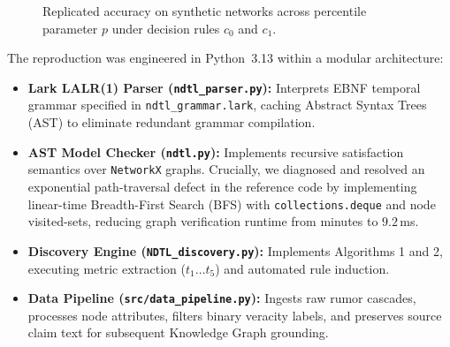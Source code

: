 \documentclass[10pt,twocolumn]{article}
\begin{document}
\begin{figure}[t]
\centering
{}
\caption{Replicated accuracy on synthetic networks across percentile parameter $p$ under decision rules $c_0$ and $c_1$.}
\label{fig:synthetic_accuracy}
\end{figure}

The reproduction was engineered in Python~3.13 within a modular architecture:
\begin{itemize}
    \item \textbf{Lark LALR(1) Parser (\texttt{ndtl\_parser.py}):} Interprets EBNF temporal grammar specified in \texttt{ndtl\_grammar.lark}, caching Abstract Syntax Trees (AST) to eliminate redundant grammar compilation.
    \item \textbf{AST Model Checker (\texttt{ndtl.py}):} Implements recursive satisfaction semantics over \texttt{NetworkX} graphs. Crucially, we diagnosed and resolved an exponential path-traversal defect in the reference code by implementing linear-time Breadth-First Search (BFS) with \texttt{collections.deque} and node visited-sets, reducing graph verification runtime from minutes to $9.2$\,ms.
    \item \textbf{Discovery Engine (\texttt{NDTL\_discovery.py}):} Implements Algorithms 1 and 2, executing metric extraction ($t_1 \dots t_5$) and automated rule induction.
    \item \textbf{Data Pipeline (\texttt{src/data\_pipeline.py}):} Ingests raw rumor cascades, processes node attributes, filters binary veracity labels, and preserves source claim text for subsequent Knowledge Graph grounding.
\end{itemize}
\end{document}
